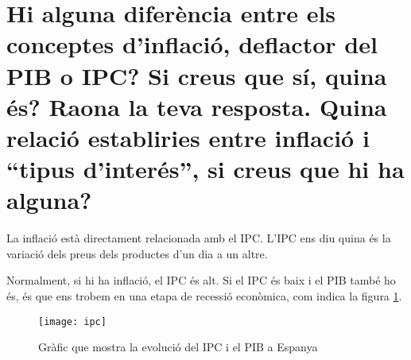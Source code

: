 \section{
  Hi alguna diferència entre els conceptes d’inflació, deflactor del PIB o
  IPC? Si creus que sí, quina és? Raona la teva resposta.
  Quina relació establiries entre
  inflació i “tipus d’interés”, si creus que hi ha alguna?
}

La inflació està directament relacionada amb el IPC. L'IPC ens diu quina
és la variació dels preus dels productes d'un dia a un altre.

Normalment, si hi ha inflació, el IPC és alt. Si el IPC és baix i el PIB
també ho és, és que ens trobem en una etapa de recessió econòmica, com
indica la figura \ref{fig:ipc}.


\begin{figure}[h]
\caption{Gràfic que mostra la evolució del IPC i el PIB a Espanya}
\centering
\texttt{[image: ipc]}
\label{fig:ipc}
\end{figure}


